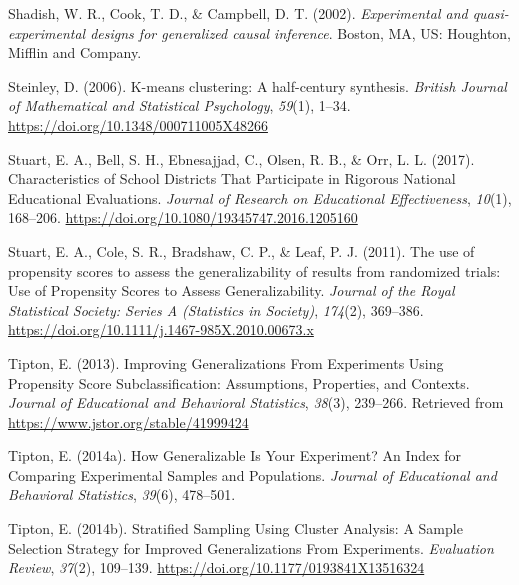 \documentclass[
  english,
  man,floatsintext]{apa6}
\newlength{\cslhangindent}
\newlength{\cslentryspacingunit} %
\newenvironment{CSLReferences}[2] %
 {%
  \setlength{\parindent}{0pt}
  \ifodd #1
  \let\oldpar\par
  \def\par{\hangindent=\cslhangindent\oldpar}
  \fi
  \setlength{\parskip}{#2\cslentryspacingunit}
 }%
 {}
\begin{document}
\begin{CSLReferences}{1}{0}
\leavevmode{}%
Shadish, W. R., Cook, T. D., \& Campbell, D. T. (2002). \emph{Experimental and quasi-experimental designs for generalized causal inference}. Boston, MA, US: {Houghton, Mifflin and Company}.

\leavevmode{}%
Steinley, D. (2006). K-means clustering: {A} half-century synthesis. \emph{British Journal of Mathematical and Statistical Psychology}, \emph{59}(1), 1--34. \url{https://doi.org/10.1348/000711005X48266}

\leavevmode{}%
Stuart, E. A., Bell, S. H., Ebnesajjad, C., Olsen, R. B., \& Orr, L. L. (2017). Characteristics of {School Districts That Participate} in {Rigorous National Educational Evaluations}. \emph{Journal of Research on Educational Effectiveness}, \emph{10}(1), 168--206. \url{https://doi.org/10.1080/19345747.2016.1205160}

\leavevmode{}%
Stuart, E. A., Cole, S. R., Bradshaw, C. P., \& Leaf, P. J. (2011). The use of propensity scores to assess the generalizability of results from randomized trials: {Use} of {Propensity Scores} to {Assess Generalizability}. \emph{Journal of the Royal Statistical Society: Series A (Statistics in Society)}, \emph{174}(2), 369--386. \url{https://doi.org/10.1111/j.1467-985X.2010.00673.x}

\leavevmode{}%
Tipton, E. (2013). Improving {Generalizations From Experiments Using Propensity Score Subclassification}: {Assumptions}, {Properties}, and {Contexts}. \emph{Journal of Educational and Behavioral Statistics}, \emph{38}(3), 239--266. Retrieved from \url{https://www.jstor.org/stable/41999424}

\leavevmode{}%
Tipton, E. (2014a). How {Generalizable Is Your Experiment}? {An Index} for {Comparing Experimental Samples} and {Populations}. \emph{Journal of Educational and Behavioral Statistics}, \emph{39}(6), 478--501.

\leavevmode{}%
Tipton, E. (2014b). Stratified {Sampling Using Cluster Analysis}: {A Sample Selection Strategy} for {Improved Generalizations From Experiments}. \emph{Evaluation Review}, \emph{37}(2), 109--139. \url{https://doi.org/10.1177/0193841X13516324}


\end{CSLReferences}
\end{document}
